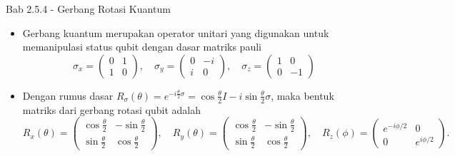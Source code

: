 \begin{frame}{Bab 2.5.4 - Gerbang Rotasi Kuantum}
    \begin{itemize}
    \item Gerbang kuantum merupakan operator unitari yang digunakan untuk memanipulasi status qubit dengan dasar matriks pauli
    \begin{equation}
        \sigma_x = \begin{pmatrix} 0 & 1 \\ 1 & 0 \end{pmatrix}, \quad \sigma_y = \begin{pmatrix} 0 & -i \\ i & 0 \end{pmatrix}, \quad \sigma_z = \begin{pmatrix} 1 & 0 \\ 0 & -1 \end{pmatrix}
    \end{equation}
    \item Dengan rumus dasar $R_{\sigma}(\theta) = e^{-i \frac{\theta}{2} \sigma} = \cos\frac{\theta}{2} I - i \sin\frac{\theta}{2} \sigma$, maka bentuk matriks dari gerbang rotasi qubit adalah
    {\tiny
    \begin{equation}
        R_x(\theta) = \begin{pmatrix} \cos\frac{\theta}{2} & -\sin\frac{\theta}{2} \\ \sin\frac{\theta}{2} & \cos\frac{\theta}{2} \end{pmatrix}, \quad R_y(\theta) = \begin{pmatrix} \cos\frac{\theta}{2} & -\sin\frac{\theta}{2} \\ \sin\frac{\theta}{2} & \cos\frac{\theta}{2} \end{pmatrix}, \quad R_z(\phi) = \begin{pmatrix} e^{-i\phi/2} & 0 \\ 0 & e^{i\phi/2} \end{pmatrix}.
    \end{equation}
    }
    \end{itemize}
\end{frame}

